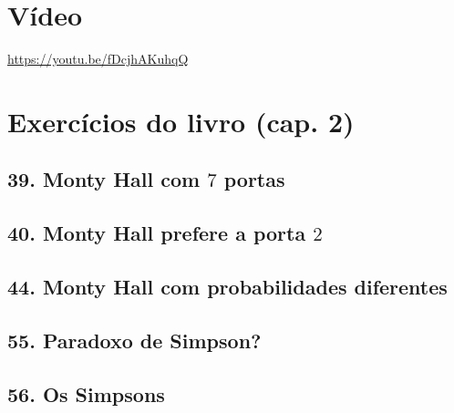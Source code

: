 \documentclass[
  11pt]{report}
\begin{document}
\hypertarget{vuxeddeo-5}{%
\section*{Vídeo}\label{vuxeddeo-5}}

\begin{center} \url{https://youtu.be/fDcjhAKuhqQ} \end{center}

\hypertarget{exercuxedcios-do-livro-cap.-2-2}{%
\section*{Exercícios do livro (cap. 2)}\label{exercuxedcios-do-livro-cap.-2-2}}

\hypertarget{monty-hall-com-7-portas}{%
\subsection*{\texorpdfstring{39. Monty Hall com $7$ portas}{39. Monty Hall com  portas}}\label{monty-hall-com-7-portas}}

\hypertarget{monty-hall-prefere-a-porta-2}{%
\subsection*{\texorpdfstring{40. Monty Hall prefere a porta $2$}{40. Monty Hall prefere a porta }}\label{monty-hall-prefere-a-porta-2}}

\hypertarget{monty-hall-com-probabilidades-diferentes}{%
\subsection*{44. Monty Hall com probabilidades diferentes}\label{monty-hall-com-probabilidades-diferentes}}

\hypertarget{paradoxo-de-simpson}{%
\subsection*{55. Paradoxo de Simpson?}\label{paradoxo-de-simpson}}

\hypertarget{os-simpsons}{%
\subsection*{56. Os Simpsons}\label{os-simpsons}}
\end{document}
